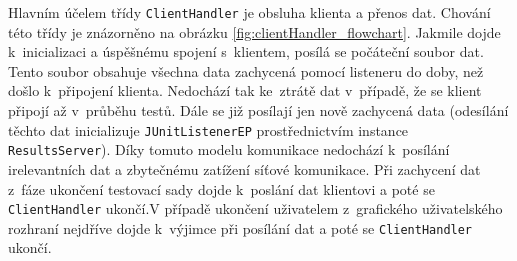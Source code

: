 	Hlavním účelem třídy \texttt{ClientHandler} je obsluha klienta a přenos dat. Chování této třídy je znázorněno na obrázku \ref{fig:clientHandler_flowchart}. Jakmile dojde k~inicializaci a úspěšnému spojení s~klientem, posílá se počáteční soubor dat. Tento soubor obsahuje všechna data zachycená pomocí listeneru do doby, než došlo k~připojení klienta. Nedochází tak ke~ztrátě dat v~případě, že se klient připojí až v~průběhu testů. Dále se již posílají jen nově zachycená data (odesílání těchto dat inicializuje \texttt{JUnitListenerEP} prostřednictvím instance \texttt{ResultsServer}). Díky tomuto modelu komunikace nedochází k~posílání irelevantních dat a zbytečnému zatížení síťové komunikace. Při zachycení dat z~fáze ukončení testovací sady dojde k~poslání dat klientovi a poté se \texttt{ClientHandler} ukončí.V případě ukončení uživatelem z~grafického uživatelského rozhraní nejdříve dojde k~výjimce při posílání dat a poté se \texttt{ClientHandler} ukončí.

